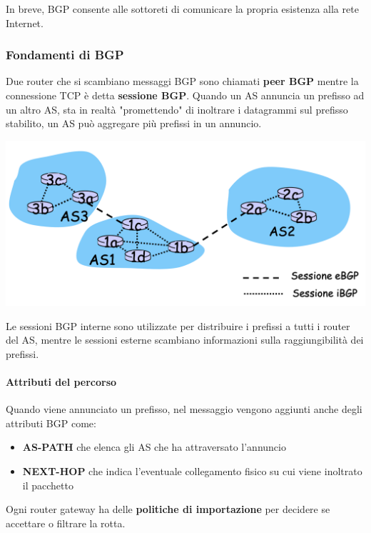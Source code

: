 \documentclass{report}
\begin{document}
In breve, BGP consente alle sottoreti di comunicare la propria esistenza
alla rete Internet.

\hypertarget{header-n280}{%
\subsubsection{Fondamenti di BGP}\label{header-n280}}

Due router che si scambiano messaggi BGP sono chiamati \textbf{peer BGP}
mentre la connessione TCP è detta \textbf{sessione BGP}. Quando un AS
annuncia un prefisso ad un altro AS, sta in realtà "promettendo" di
inoltrare i datagrammi sul prefisso stabilito, un AS può aggregare più
prefissi in un annuncio.

\begin{center}
		\includegraphics[width=0.7\linewidth]{bgp}
	\end{center}

Le sessioni BGP interne sono utilizzate per distribuire i prefissi a
tutti i router del AS, mentre le sessioni esterne scambiano informazioni
sulla raggiungibilità dei prefissi.

\hypertarget{header-n328}{%
\paragraph{Attributi del percorso}\label{header-n328}}

Quando viene annunciato un prefisso, nel messaggio vengono aggiunti
anche degli attributi BGP come:

\begin{itemize}
\item
  \textbf{AS-PATH} che elenca gli AS che ha attraversato l'annuncio
\item
  \textbf{NEXT-HOP} che indica l'eventuale collegamento fisico su cui
  viene inoltrato il pacchetto
\end{itemize}

Ogni router gateway ha delle \textbf{politiche di importazione} per
decidere se accettare o filtrare la rotta.
\end{document}
